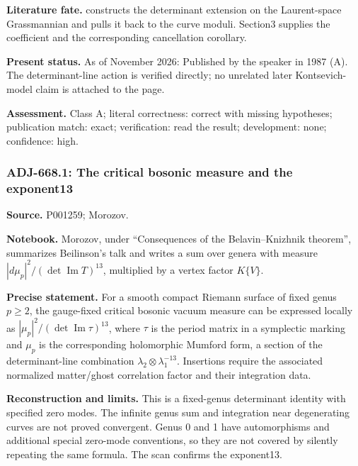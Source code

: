 \noindent\textbf{Literature fate.} \citet[\S\S2--3]{kontsevich1987virasoro} constructs the determinant extension on the Laurent-space Grassmannian and pulls it back to the curve moduli. Section3 supplies the coefficient and the corresponding cancellation corollary.\par

\noindent\textbf{Present status.} As of November 2026: Published by the speaker in 1987 (A). The determinant-line action is verified directly; no unrelated later Kontsevich-model claim is attached to the page.\par

\noindent\textbf{Assessment.} Class A; literal correctness: correct with missing hypotheses; publication match: exact; verification: read the result; development: none; confidence: high.\par

\subsubsection{ADJ-668.1: The critical bosonic measure and the exponent13}
\noindent\textbf{Source.} P001259; Morozov.\par
\noindent\textbf{Notebook.} Morozov, under ``Consequences of the Belavin--Knizhnik theorem'', summarizes Beilinson's talk and writes a sum over genera with measure \(|d\mu_p|^2/(\det\operatorname{Im}T)^{13}\), multiplied by a vertex factor \(K\{V\}\).\par

\noindent\textbf{Precise statement.} For a smooth compact Riemann surface of fixed genus \(p\ge2\), the gauge-fixed critical bosonic vacuum measure can be expressed locally as \(|\mu_p|^2/(\det\operatorname{Im}\tau)^{13}\), where \(\tau\) is the period matrix in a symplectic marking and \(\mu_p\) is the corresponding holomorphic Mumford form, a section of the determinant-line combination \(\lambda_2\otimes\lambda_1^{-13}\). Insertions require the associated normalized matter/ghost correlation factor and their integration data.\par

\noindent\textbf{Reconstruction and limits.} This is a fixed-genus determinant identity with specified zero modes. The infinite genus sum and integration near degenerating curves are not proved convergent. Genus 0 and 1 have automorphisms and additional special zero-mode conventions, so they are not covered by silently repeating the same formula. The scan confirms the exponent13.\par

